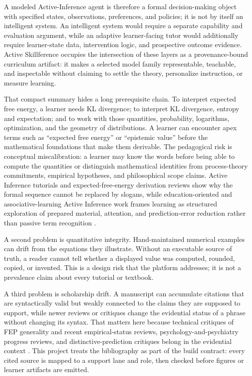 \documentclass[
  english,
]{article}
\begin{document}
A modeled Active-Inference agent is therefore a formal decision-making
object with specified states, observations, preferences, and policies;
it is not by itself an intelligent system. An intelligent system would
require a separate capability and evaluation argument, while an adaptive
learner-facing tutor would additionally require learner-state data,
intervention logic, and prospective outcome evidence. Active
Skillference occupies the intersection of these layers as a
provenance-bound curriculum artifact: it makes a selected model family
representable, teachable, and inspectable without claiming to settle the
theory, personalize instruction, or measure learning.

That compact summary hides a long prerequisite chain. To interpret
expected free energy, a learner needs KL divergence; to interpret KL
divergence, entropy and expectation; and to work with those quantities,
probability, logarithms, optimization, and the geometry of
distributions. A learner can encounter apex terms such as ``expected
free energy'' or ``epistemic value'' before the mathematical foundations
that make them derivable. The pedagogical risk is conceptual
miscalibration: a learner may know the words before being able to
compute the quantities or distinguish mathematical identities from
process-theory commitments, empirical hypotheses, and philosophical
scope claims. Active Inference tutorials and expected-free-energy
derivation reviews show why the formal sequence cannot be replaced by
slogans, while education-oriented and associative-learning Active
Inference work frames learning as structured exploration of prepared
material, attention, and prediction-error reduction rather than passive
term recognition
\citep{smith2022tutorial, millidge2021whence, champion2026reframing, dipaolo2024school, anokhin2024associative_active_inference}.

A second problem is quantitative integrity. Hand-maintained numerical
examples can drift from the equations they illustrate. Without an
executable source of truth, a reader cannot tell whether a displayed
value was computed, rounded, copied, or invented. This is a design risk
that the platform addresses; it is not a prevalence claim about every
tutorial or textbook.

A third problem is scholarship drift. A manuscript can accumulate
citations that are syntactically valid but weakly connected to the
claims they are supposed to support, while newer reviews or critiques
change the evidential status of a phrase without changing its syntax.
That matters here because technical critiques of FEP generality and
recent empirical-status reviews, psychology-and-psychiatry progress
reviews, and distinctive-prediction critiques belong in the evidential
context
\citep{aguilera2022particular, aguilera2023confederation, hodson2024empirical, badcock2024psychology_psychiatry, gershman2019free}.
This project treats the bibliography as part of the build contract:
every cited source is mapped to a support lane and role, then checked
before figures or learner artifacts are emitted.
\end{document}
